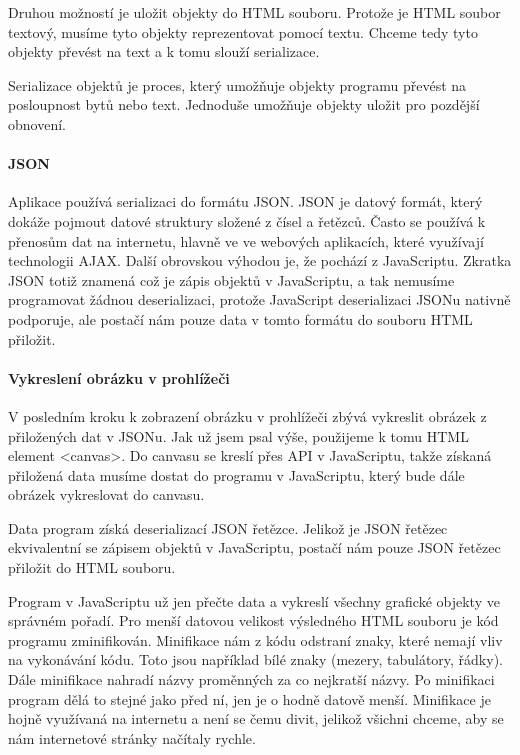 \documentclass[
  field=inf,
  biblatex=false,
  glossaries,
  index
]{kidiplom}
\begin{document}
Druhou možností je uložit objekty do HTML souboru. Protože je HTML soubor textový, musíme tyto objekty reprezentovat pomocí textu. Chceme tedy tyto objekty převést na text a k tomu slouží serializace.

Serializace objektů je proces, který umožňuje objekty programu převést na posloupnost bytů nebo text. Jednoduše umožňuje objekty uložit pro pozdější obnovení.



\paragraph{JSON}
Aplikace používá serializaci do formátu JSON. JSON je datový formát, který dokáže pojmout datové struktury složené z čísel a řetězců. Často se používá k přenosům dat na internetu, hlavně ve ve webových aplikacích, které využívají technologii AJAX. Další obrovskou výhodou je, že pochází z JavaScriptu. Zkratka JSON totiž znamená  což je zápis objektů v JavaScriptu, a tak nemusíme programovat žádnou deserializaci, protože JavaScript deserializaci JSONu nativně podporuje, ale postačí nám pouze data v tomto formátu do souboru HTML přiložit. \cite{json}


\paragraph{Vykreslení obrázku v prohlížeči}
V posledním kroku k zobrazení obrázku v prohlížeči zbývá vykreslit obrázek z přiložených dat v JSONu. Jak už jsem psal výše, použijeme k tomu HTML element <canvas>. Do canvasu se kreslí přes API v JavaScriptu, takže získaná přiložená data musíme dostat do programu v JavaScriptu, který bude dále obrázek vykreslovat do canvasu. 

Data program získá deserializací JSON řetězce. Jelikož je JSON řetězec ekvivalentní se zápisem objektů v JavaScriptu, postačí nám pouze JSON řetězec přiložit do HTML souboru.

Program v JavaScriptu už jen přečte data a vykreslí všechny grafické objekty ve správném pořadí. Pro menší datovou velikost výsledného HTML souboru je kód programu zminifikován. Minifikace nám z kódu odstraní znaky, které nemají vliv na vykonávání kódu. Toto jsou například bílé znaky (mezery, tabulátory, řádky). Dále minifikace nahradí názvy proměnných za co nejkratší názvy. Po minifikaci program dělá to stejné jako před ní, jen je o hodně datově menší. Minifikace je hojně využívaná na internetu a není se čemu divit, jelikož všichni chceme, aby se nám internetové stránky načítaly rychle.
\end{document}
